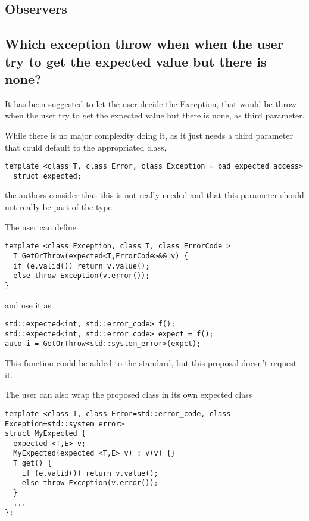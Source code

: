 \documentclass[a4paper,10pt]{article}
\begin{document}
\subsection{Observers}

\subsection{Which exception throw when when the user try to get the expected value but there is none?}

It has been suggested to let the user decide the Exception, that would be throw when the user try to get the expected value but there is none, as third parameter. 

While there is no major complexity doing it, as it just needs a third parameter that could default to the appropriated class, 

\begin{lstlisting}
template <class T, class Error, class Exception = bad_expected_access>
  struct expected;
\end{lstlisting}

the authors consider that this is not really needed and that this parameter should not really be part of the type.

The user can define

\begin{lstlisting}
template <class Exception, class T, class ErrorCode >
  T GetOrThrow(expected<T,ErrorCode>&& v) {
  if (e.valid()) return v.value();
  else throw Exception(v.error());
}
\end{lstlisting}

and use it as

\begin{lstlisting}
std::expected<int, std::error_code> f();
std::expected<int, std::error_code> expect = f();
auto i = GetOrThrow<std::system_error>(expct);  
\end{lstlisting}

This function could be added to the standard, but this proposal doesn't request it. 

The user can also wrap the proposed class in its own expected class

\begin{lstlisting}
template <class T, class Error=std::error_code, class Exception=std::system_error>
struct MyExpected {
  expected <T,E> v;
  MyExpected(expected <T,E> v) : v(v) {}
  T get() {  
    if (e.valid()) return v.value();
    else throw Exception(v.error());
  }
  ...
};
\end{lstlisting}
\end{document}
